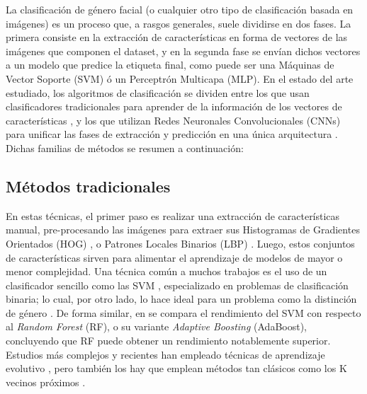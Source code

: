 La clasificación de género facial (o cualquier otro tipo de clasificación basada en imágenes) es un proceso que, a rasgos generales, suele dividirse en dos fases. La primera consiste en la extracción de características en forma de vectores de las imágenes que componen el dataset, y en la segunda fase se envían dichos vectores a un modelo que predice la etiqueta final, como puede ser una Máquinas de Vector Soporte (SVM) ó un Perceptrón Multicapa (MLP). En el estado del arte estudiado, los algoritmos de clasificación se dividen entre los que usan clasificadores tradicionales para aprender de la información de los vectores de características \cite{loo2018influence,lin2020face,khryashchev2013adaptive,tianyu2018human}, y los que utilizan Redes Neuronales Convolucionales (CNNs) para unificar las fases de extracción y predicción en una única arquitectura \cite{wu2020gender,islam2020human,garain2021gra_net,agbo2020deeply,sumi2021human,zhang2020gender}. Dichas familias de métodos se resumen a continuación:

\subsection{Métodos tradicionales\label{SUBSEC:TRADITIONAL}}

En estas técnicas, el primer paso es realizar una extracción de características manual, pre-procesando las imágenes para extraer sus Histogramas de Gradientes Orientados (HOG) \cite{dalal2005histograms}, o Patrones Locales Binarios (LBP) \cite{tianyu2018human}. Luego, estos conjuntos de características sirven para alimentar el aprendizaje de modelos de mayor o menor complejidad. Una técnica común a muchos trabajos es el uso de un clasificador sencillo como las SVM \cite{lin2020face,hiremath2021human,tianyu2018human,khryashchev2013adaptive,verma2019local,loo2018influence}, especializado en problemas de clasificación binaria; lo cual, por otro lado, lo hace ideal para un problema como la distinción de género \cite{khryashchev2013adaptive}. De forma similar, en \citet{poornima2021classification} se compara el rendimiento del SVM con respecto al \textit{Random Forest} (RF), o su variante \textit{Adaptive Boosting} (AdaBoost), concluyendo que RF puede obtener un rendimiento notablemente superior. Estudios más complejos y recientes han empleado técnicas de aprendizaje evolutivo \cite{yilmaz2021evolutionary}, pero también los hay que emplean métodos tan clásicos como los K vecinos próximos \cite{lin2020face}.

